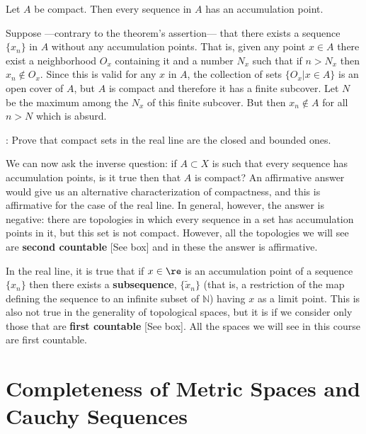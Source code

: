 \espa

\bteo
Let $A$ be compact. Then every sequence in $A$ has an accumulation point.
\eteo

\espa

\bpru
Suppose ---contrary to the theorem's assertion--- that
there exists a sequence $\{x_n\}$ in $A$ without any accumulation points.
That is, given any point $x \in A$ there exist a neighborhood $O_x$
containing it and a number $N_x$ such that if $n > N_x$ then $x_n \notin
O_x$. Since this is valid for any $x$ in $A$, the collection of
sets $\{ O_x | x \in A \}$ is an open cover of $A$, but $A$ is compact and therefore
it has a finite subcover.
Let $N$ be the maximum among the $N_x$ of this finite subcover. But then
$x_n \notin A$ for all $n > N$ which is absurd.  
\epru

\ejer: Prove that compact sets in the real line are the
closed and bounded ones.


We can now ask the inverse question: if $A \subset X$ is
such that every sequence has accumulation points, is it true
then that $A$ is compact? An affirmative answer would give us
an alternative characterization of compactness, and this is
affirmative for the case of the real line. In general, however, the answer is
negative: there are topologies in which every sequence in a
set has accumulation points in it, but this set is not
compact. However, all the topologies we will see are {\bf second countable} [See box] and in these
the answer is affirmative.

In the real line, it is true that if $x \in \re $ is an accumulation point of a sequence $\{x_n\}$ then there exists a {\bf
subsequence}, $\{\tilde{x}_n\}$ (that is, a restriction of the
map defining the sequence to an infinite subset of $\mathbb{N}$) having $x$ as a limit point. This is also not
true in the generality of topological spaces, but it is if we consider only those that are {\bf first countable} [See box]. All the spaces we will see in this
course are first countable.

\espa 
\vfill   




\section{Completeness of Metric Spaces and Cauchy Sequences}


